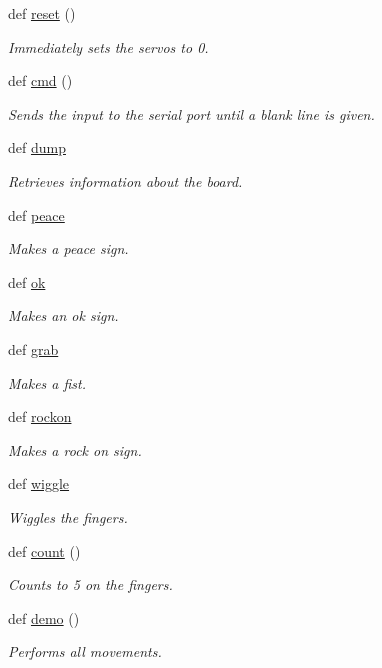 \begin{DoxyCompactItemize}
def \hyperlink{namespacerhand_a35b7a24c0fca46cc12c8b4f8dff1ca60}{reset} ()
\begin{DoxyCompactList}\small\item\em Immediately sets the servos to 0. \end{DoxyCompactList}\item 
def \hyperlink{namespacerhand_ab4d31fdc0cc6af978462c3ce89471ebc}{cmd} ()
\begin{DoxyCompactList}\small\item\em Sends the input to the serial port until a blank line is given. \end{DoxyCompactList}\item 
def \hyperlink{namespacerhand_a454d60da128e382837a23869bc7f2dc3}{dump}
\begin{DoxyCompactList}\small\item\em Retrieves information about the board. \end{DoxyCompactList}\item 
def \hyperlink{namespacerhand_a65197be63e787991f1c6908702f96827}{peace}
\begin{DoxyCompactList}\small\item\em Makes a peace sign. \end{DoxyCompactList}\item 
def \hyperlink{namespacerhand_adbd162a3c95928cede30512e7706b34f}{ok}
\begin{DoxyCompactList}\small\item\em Makes an ok sign. \end{DoxyCompactList}\item 
def \hyperlink{namespacerhand_afcb625c2974e86fd96d15468163e637f}{grab}
\begin{DoxyCompactList}\small\item\em Makes a fist. \end{DoxyCompactList}\item 
def \hyperlink{namespacerhand_a04f206f11dd8bade26059b9242018d4a}{rockon}
\begin{DoxyCompactList}\small\item\em Makes a rock on sign. \end{DoxyCompactList}\item 
def \hyperlink{namespacerhand_accaafffcfa6ad3179403555fac5a770c}{wiggle}
\begin{DoxyCompactList}\small\item\em Wiggles the fingers. \end{DoxyCompactList}\item 
def \hyperlink{namespacerhand_a64a1b3a87babcdafeca92de6ad59efed}{count} ()
\begin{DoxyCompactList}\small\item\em Counts to 5 on the fingers. \end{DoxyCompactList}\item 
def \hyperlink{namespacerhand_ab61f76a347c39c86870720263e1ffbdc}{demo} ()
\begin{DoxyCompactList}\small\item\em Performs all movements. \end{DoxyCompactList}\end{DoxyCompactItemize}
